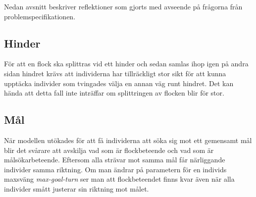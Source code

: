 \documentclass[titlepage, a4paper, 12pt]{article}
\begin{document}

Nedan avsnitt beskriver reflektioner som gjorts med avseende på
frågorna från problemspecifikationen.

\subsection{Hinder}
För att en flock ska splittras vid ett hinder och sedan samlas ihop
igen på andra sidan hindret krävs att individerna har tillräckligt
stor sikt för att kunna upptäcka individer som tvingades välja en
annan väg runt hindret. Det kan hända att detta fall inte inträffar om
splittringen av flocken blir för stor.

\subsection{Mål}
När modellen utökades för att få individerna att söka sig mot ett
gemensamt mål blir det svårare att avskilja vad som är flockbeteende
och vad som är målsökarbeteende. Eftersom alla strävar mot samma mål
får närliggande individer samma riktning. Om man ändrar på parametern
för en individs maxsväng \textit{max-goal-turn} ser man att
flockbeteendet finns kvar även när alla individer smått justerar sin
riktning mot målet. 

\newpage
\appendix
{}
\end{document}
